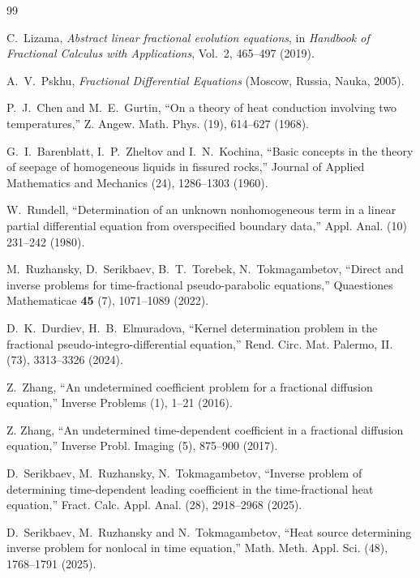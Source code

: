 \documentclass[reqno]{amsart}
\theoremstyle{definition}
\numberwithin{equation}{section}
\begin{document}
\FloatBarrier
\begin{thebibliography}{99}

 C.~Lizama,  \textit{Abstract linear fractional evolution equations}, in \textit{Handbook of Fractional Calculus with Applications}, Vol.~2, 465--497 (2019).

 A.~V.~Pskhu, \textit{Fractional Differential Equations} (Moscow, Russia, Nauka, 2005).

 P.~J.~Chen and M.~E.~Gurtin, ``On a theory of heat conduction involving two temperatures,'' Z.
Angew. Math. Phys. (19), 614--627 (1968).

 G.~I.~Barenblatt, I.~P.~Zheltov and I.~N.~Kochina, ``Basic concepts in the theory of seepage of homogeneous liquids in fissured rocks,'' Journal of Applied Mathematics and Mechanics (24), 1286--1303 (1960).

 W.~Rundell, ``Determination of an unknown nonhomogeneous term in a linear partial differential equation from overspecified boundary data,'' Appl. Anal. (10) 231--242 (1980).

 M.~Ruzhansky,  D.~Serikbaev,  B.~T.~Torebek, N.~Tokmagambetov, ``Direct and inverse problems for time-fractional pseudo-parabolic equations,'' Quaestiones Mathematicae \textbf{45} (7), 1071--1089 (2022).

 D.~K.~Durdiev, H.~B.~Elmuradova, ``Kernel determination problem in the fractional pseudo-integro-differential equation,'' Rend. Circ. Mat. Palermo, II. (73), 3313--3326 (2024).

 Z.~Zhang, ``An undetermined coefficient problem for a fractional diffusion equation,'' Inverse Problems (1), 1--21 (2016).

 Z. Zhang, ``An undetermined time-dependent coefficient in a fractional diffusion equation,'' Inverse Probl. Imaging (5), 875--900 (2017).

 D.~Serikbaev, M.~Ruzhansky, N.~Tokmagambetov, ``Inverse problem of determining time-dependent leading coefficient in the time-fractional heat equation,'' Fract. Calc. Appl. Anal. (28), 2918--2968 (2025).

 D.~Serikbaev, M.~Ruzhansky and N.~Tokmagambetov, ``Heat source determining inverse problem for nonlocal in time equation,'' Math. Meth. Appl. Sci. (48), 1768--1791 (2025).


\end{thebibliography}
\end{document}
